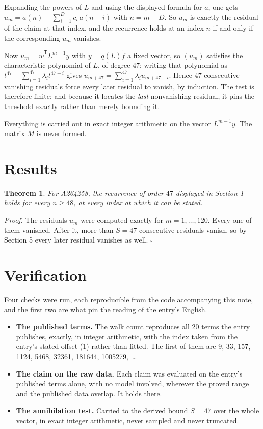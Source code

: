 \documentclass[11pt]{article}
\newtheorem{theorem}{Theorem}
\theoremstyle{definition}
\begin{document}
Expanding the powers of $L$ and using the displayed formula for $a$, one gets $u_m = a(n) - \sum_{i=1}^{D} c_i\,a(n-i)$ with $n = m + D$. So $u_m$ is exactly the residual of the claim at that index, and the recurrence holds at an index $n$ if and only if the corresponding $u_m$ vanishes.

Now $u_m = \tilde w^{\mathsf T} L^{m-1} y$ with $y = q(L)\tilde f$ a fixed vector, so $(u_m)$ satisfies the characteristic polynomial of $L$, of degree $47$: writing that polynomial as $t^{47} - \sum_{i=1}^{47} \lambda_i t^{47-i}$ gives $u_{m+47} = \sum_{i=1}^{47} \lambda_i u_{m+47-i}$. Hence $47$ consecutive vanishing residuals force every later residual to vanish, by induction. The test is therefore finite; and because it locates the {\itshape last} nonvanishing residual, it pins the threshold exactly rather than merely bounding it.

Everything is carried out in exact integer arithmetic on the vector $L^{m-1}y$. The matrix $M$ is never formed.

\section{Results}

\begin{theorem} For A264258, the recurrence of order $47$ displayed in Section 1 holds for every $n \ge 48$, at every index at which it can be stated.\end{theorem}

{\itshape Proof.} The residuals $u_m$ were computed exactly for $m = 1,\dots,120$. Every one of them vanished. After it, more than $S = 47$ consecutive residuals vanish, so by Section 5 every later residual vanishes as well. $\square$

\section{Verification}

Four checks were run, each reproducible from the code accompanying this note, and the first two are what pin the reading of the entry's English.

\begin{itemize}

\item {\bfseries The published terms.} The walk count reproduces all 20 terms the entry publishes, exactly, in integer arithmetic, with the index taken from the entry's stated offset (1) rather than fitted. The first of them are 9, 33, 157, 1124, 5468, 32361, 181644, 1005279,~\dots

\item {\bfseries The claim on the raw data.} Each claim was evaluated on the entry's published terms alone, with no model involved, wherever the proved range and the published data overlap. It holds there.

\item {\bfseries The annihilation test.} Carried to the derived bound $S = 47$ over the whole vector, in exact integer arithmetic, never sampled and never truncated.

\end{itemize}
\end{document}
